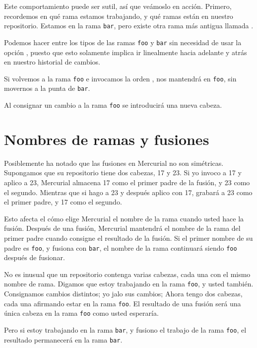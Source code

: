 Este comportamiento puede ser sutil, así que veámoslo en acción.  Primero,
recordemos en qué rama estamos trabajando, y qué ramas están en
nuestro repositorio.
Estamos en la rama \texttt{bar}, pero existe otra rama más antigua
llamada .

Podemos hacer  entre los tipos de las ramas \texttt{foo}
y \texttt{bar} sin necesidad de usar la opción ,
puesto que esto solamente implica ir linealmente hacia adelante y
atrás en nuestro historial de cambios.

Si volvemos a la rama \texttt{foo} e invocamos la orden ,
nos mantendrá en \texttt{foo}, sin movernos a la punta de \texttt{bar}.

Al consignar un cambio a la rama \texttt{foo} se introducirá una nueva
cabeza.

\section{Nombres de ramas y fusiones}

Posiblemente ha notado que las fusiones en Mercurial no son simétricas.
Supongamos que su repositorio tiene dos cabezas, 17 y 23.  Si yo invoco
 a 17 y aplico  a 23, Mercurial almacena 17
como el primer padre de la fusión, y 23 como el segundo. Mientras que
si hago  a 23 y después aplico  con 17,
grabará a 23 como el primer padre, y 17 como el segundo.

Esto afecta el cómo elige Mercurial el nombre de la rama cuando usted
hace la fusión.  Después de una fusión, Mercurial mantendrá el nombre de la
rama del primer padre cuando consigne el resultado de la fusión.  Si
el primer nombre de su padre es \texttt{foo}, y fusiona con
\texttt{bar}, el nombre de la rama continuará siendo \texttt{foo}
después de fusionar.

No es inusual que un repositorio contenga varias cabezas, cada una con
el mismo nombre de rama.  Digamos que estoy trabajando en la rama
\texttt{foo}, y usted también.  Consignamos cambios distintos; yo jalo
sus cambios; Ahora tengo dos cabezas, cada una afirmando estar en la
rama \texttt{foo}.  El resultado de una fusión será una única cabeza
en la rama \texttt{foo} como usted esperaría.

Pero si estoy trabajando en la rama \texttt{bar}, y fusiono el trabajo
de la rama \texttt{foo}, el resultado permanecerá en la rama
\texttt{bar}.


